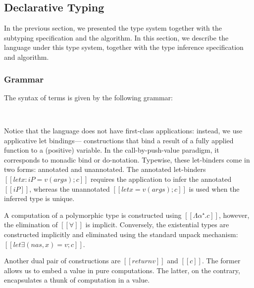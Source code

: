 \newpage

\subsection{Declarative Typing}

In the previous section, we presented the type system together with the subtyping
specification and the algorithm. In this section, we describe the language under
this type system, together with the type inference specification and algorithm.  

\subsubsection{Grammar}

The syntax of \fexists terms is given by the following grammar:
\begin{definition}
  \hfill\\
  \begin{minipage}[t]{0.45\textwidth}
    \ottgrammartabular{
      \ottc\ottinterrule
    }
  \end{minipage} \hfill
  \begin{minipage}[t]{0.45\textwidth}
    \ottgrammartabular{
      \ottv\ottinterrule
    }
  \end{minipage}
\end{definition}

Notice that the language does not have
first-class applications: instead, 
we use applicative let bindings---
constructions that bind a result of
a fully applied function to a (positive) 
variable.
In the call-by-push-value paradigm, 
it corresponds to monadic bind or do-notation. 
Typewise, these let-binders come in two forms:
annotated and unannotated. The annotated let-binders
$[[let x:iP = v(args); c]]$ 
requires the application to infer the annotated
$[[iP]]$, whereas the unannotated 
$[[let x = v(args); c]]$ 
is used when the inferred type is unique. 

A computation of a polymorphic type is constructed 
using $[[Λα⁺ . c]]$, however, the elimination of $[[∀]]$
is implicit. Conversely, the existential types
are constructed implicitly and eliminated 
using the standard unpack mechanism:
$[[let∃ (nas, x) = v; c]]$.

Another dual pair of constructions are 
$[[return v]]$ and $[[{c}]]$. 
The former allows us to embed a value in pure 
computations. The latter, on the contrary,
encapsulates a thunk of computation in a value. 

